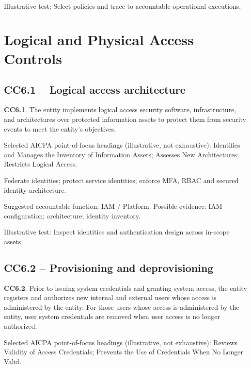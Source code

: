 \documentclass[10pt,oneside]{report}
\begin{document}
Illustrative test: Select policies and trace to accountable operational executions.

\section{Logical and Physical Access Controls}
\subsection*{CC6.1 -- Logical access architecture}
\begin{aicpabox}
\textbf{CC6.1}. The entity implements logical access security software, infrastructure, and architectures over protected information assets to protect them from security events to meet the entity's objectives.\par{}
\end{aicpabox}
Selected AICPA point-of-focus headings (illustrative, not exhaustive): Identifies and Manages the Inventory of Information Assets; Assesses New Architectures; Restricts Logical Access.

\begin{engineeringbox}
Federate identities; protect service identities; enforce MFA, RBAC and secured identity architecture.
\end{engineeringbox}
Suggested accountable function: IAM / Platform. Possible evidence: IAM configuration; architecture; identity inventory.

Illustrative test: Inspect identities and authentication design across in-scope assets.

\subsection*{CC6.2 -- Provisioning and deprovisioning}
\begin{aicpabox}
\textbf{CC6.2}. Prior to issuing system credentials and granting system access, the entity registers and authorizes new internal and external users whose access is administered by the entity. For those users whose access is administered by the entity, user system credentials are removed when user access is no longer authorized.\par{}
\end{aicpabox}
Selected AICPA point-of-focus headings (illustrative, not exhaustive): Reviews Validity of Access Credentials; Prevents the Use of Credentials When No Longer Valid.
\end{document}
